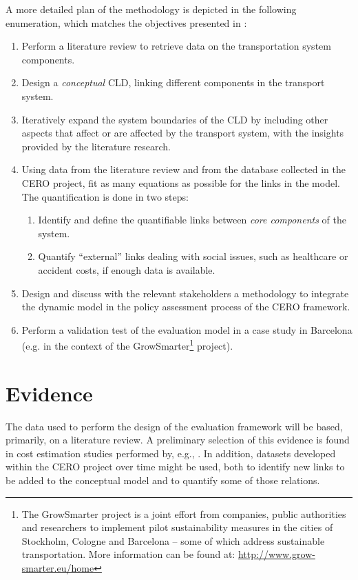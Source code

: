 A more detailed plan of the methodology is depicted in the following enumeration, which matches the objectives presented in :
%
\begin{enumerate}[label=(\alph*)]
	\item Perform a literature review to retrieve data on the transportation system components.
	\item Design a \textit{conceptual} CLD, linking different components in the transport system.
	\item Iteratively expand the system boundaries of the CLD by including other aspects that affect or are affected by the transport system, with the insights provided by the literature research.
	\item Using data from the literature review and from the database collected in the CERO project, fit as many equations as possible for the links in the model. The quantification is done in two steps:
	\begin{enumerate}[label=\roman*.]
		\item Identify and define the quantifiable links between \textit{core components} of the system.
		\item Quantify ``external'' links dealing with social issues, such as healthcare or accident costs, if enough data is available.
	\end{enumerate}
	\item Design and discuss with the relevant stakeholders a methodology to integrate the dynamic model in the policy assessment process of the CERO framework.
	\item Perform a validation test of the evaluation model in a case study in Barcelona (e.g. in the context of the GrowSmarter\footnote{The GrowSmarter project is a joint effort from companies, public authorities and researchers to implement pilot sustainability measures in the cities of Stockholm, Cologne and Barcelona -- some of which address sustainable transportation. More information can be found at: \url{http://www.grow-smarter.eu/home}} project).
\end{enumerate}

\section{Evidence}
\label{s:evidence}
The data used to perform the design of the evaluation framework will be based, primarily, on a literature review. A preliminary selection of this evidence is found in cost estimation studies performed by, e.g., \textcite{lizeng2012costcongestion,robert2006stockholm2030,trafikverket2016asek,mizutani2011estimatingcosts}. In addition, datasets developed within the CERO project over time might be used, both to identify new links to be added to the conceptual model and to quantify some of those relations.

